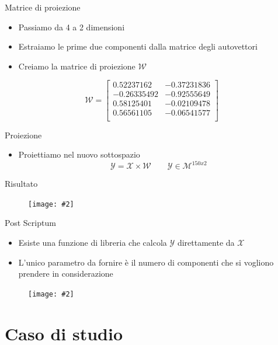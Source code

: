 \documentclass[xcolor={dvipsnames}]{beamer}%
\newcommand{\codice}[2]{}
\newcommand{\figcen}[2]{
	\begin{figure}
		\begin{center}
			\texttt{[image: \#2]}
		\end{center}
	\end{figure}
}
\begin{document}
		\begin{frame}{Matrice di proiezione}
			\begin{itemize}
				\item Passiamo da 4 a 2 dimensioni
				\item Estraiamo le prime due componenti dalla matrice degli autovettori
			\end{itemize}
			\codice{125}{127}
			\begin{itemize}
				\item Creiamo la matrice di proiezione $\mathcal{W}$
			\end{itemize}
			$$\mathcal{W} = \begin{bmatrix}
			0.52237162 & -0.37231836\\
			-0.26335492 & -0.92555649\\
			0.58125401 & -0.02109478\\
			0.56561105 & -0.06541577\\
			\end{bmatrix}$$
		\end{frame}
	
		\begin{frame}{Proiezione}
			\begin{itemize}
				\item Proiettiamo nel nuovo sottospazio $$\mathcal{Y} = \mathcal{X}\times \mathcal{W} \qquad \mathcal{Y} \in \mathcal{M}^{150x2}$$
			\end{itemize}
			\codice{132}{133}
		\end{frame}
	
		\begin{frame}{Risultato}
			\figcen{.8\textwidth}{PCA}
		\end{frame}
	
		\begin{frame}{Post Scriptum}
			\begin{itemize}
				\item Esiste una funzione di libreria che calcola $\mathcal{Y}$ direttamente da $\mathcal{X}$
				\item L'unico parametro da fornire è il numero di componenti che si vogliono prendere in considerazione
			\end{itemize}
			\codice{149}{151}
			\figcen{.3\textwidth}{ok}
		\end{frame}

\section{Caso di studio}
	
\end{document}
